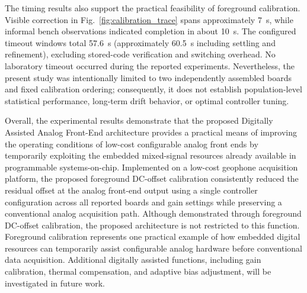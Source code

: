 The timing results also support the practical feasibility of foreground calibration. Visible correction in Fig.~\ref{fig:calibration_trace} spans approximately 7~s, while informal bench observations indicated completion in about 10~s. The configured timeout windows total 57.6~s (approximately 60.5~s including settling and refinement), excluding stored-code verification and switching overhead. No laboratory timeout occurred during the reported experiments. Nevertheless, the present study was intentionally limited to two independently assembled boards and fixed calibration ordering; consequently, it does not establish population-level statistical performance, long-term drift behavior, or optimal controller tuning.

Overall, the experimental results demonstrate that the proposed Digitally Assisted Analog Front-End architecture provides a practical means of improving the operating conditions of low-cost configurable analog front ends by temporarily exploiting the embedded mixed-signal resources already available in programmable systems-on-chip. Implemented on a low-cost geophone acquisition platform, the proposed foreground DC-offset calibration consistently reduced the residual offset at the analog front-end output using a single controller configuration across all reported boards and gain settings while preserving a conventional analog acquisition path. Although demonstrated through foreground DC-offset calibration, the proposed architecture is not restricted to this function. Foreground calibration represents one practical example of how embedded digital resources can temporarily assist configurable analog hardware before conventional data acquisition. Additional digitally assisted functions, including gain calibration, thermal compensation, and adaptive bias adjustment, will be investigated in future work.
